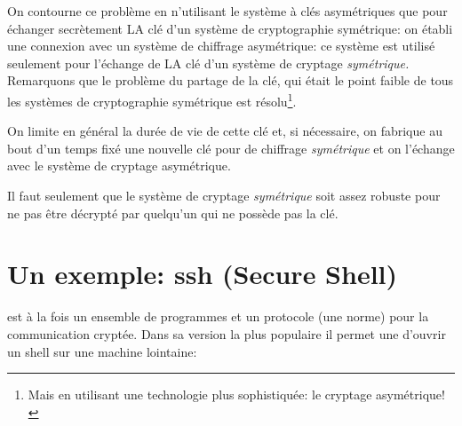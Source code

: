 On contourne ce problème en n'utilisant le système à clés
asymétriques que pour échanger secrètement LA clé d'un système de
cryptographie symétrique: on établi une connexion avec un système de
chiffrage asymétrique: ce système est utilisé seulement pour l'échange
de LA clé d'un système de cryptage \emph{symétrique.}
Remarquons que le problème du partage de la clé, qui était le point
faible de tous les systèmes de cryptographie symétrique est
résolu\footnote{Mais en utilisant une technologie plus sophistiquée:
  le cryptage asymétrique!}. 

On limite en général la
\og durée de vie\fg{} de cette clé et, si nécessaire, on fabrique au
bout d'un temps fixé une
nouvelle clé pour de chiffrage \emph{symétrique} et on l'échange avec
le système de cryptage asymétrique.

Il faut \og seulement\fg{} que le système de cryptage
  \emph{symétrique} soit assez robuste pour ne pas être décrypté par
  quelqu'un qui ne possède pas la clé.


\section{Un exemple: ssh (Secure Shell)}
 est à la fois un ensemble de programmes et un protocole (une
norme) pour la communication cryptée. Dans sa version la plus
populaire il permet une d'ouvrir un shell sur une machine lointaine:

